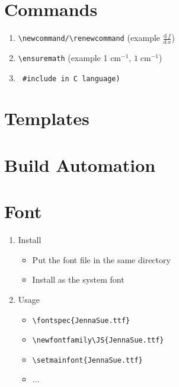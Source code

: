 \documentclass[aspectratio=43]{beamer}
\newcommand{\diff}[2]{\frac{\mathrm{d}\,#1}{\mathrm{d}\,#2}}
\newcommand{\wn}{\ensuremath{\mathrm{cm}^{-1}}}
\begin{document}
\section{Commands}
\begin{frame}[fragile]
\begin{enumerate}
\item \verb!\newcommand/\renewcommand! (example $\diff{f}{x}$)
\item \verb!\ensuremath! (example 1 \wn, $1\;\wn$)
\item \verb! #include in C language)!
\end{enumerate}
\end{frame}
\section{Templates}
\section{Build Automation}
\section{Font}
\begin{frame}[fragile]
\begin{enumerate}
\item Install
\begin{itemize}
\item Put the font file in the same directory
\item Install as the system font
\end{itemize}
\item Usage
\begin{itemize}
\item \verb!\fontspec{JennaSue.ttf}!
\item \verb!\newfontfamily\JS{JennaSue.ttf}!
\item \verb!\setmainfont{JennaSue.ttf}!
\item ...
\end{itemize}
\end{enumerate}
\end{frame}
\end{document}

